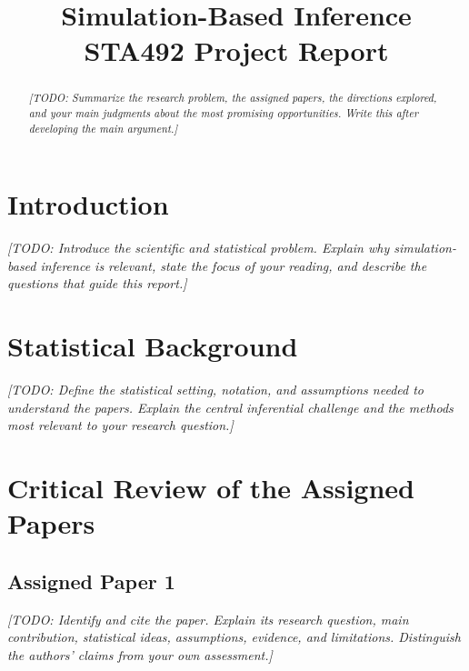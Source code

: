 \documentclass[11pt,letterpaper]{article}
\title{Simulation-Based Inference\\[0.3em]
  \large STA492 Project Report}
\author{\placeholder{Group member names}}
\date{\placeholder{Submission date}}
\newcommand{\placeholder}[1]{\textit{[TODO: #1]}}
\begin{document}
\maketitle

\begin{abstract}
\placeholder{Summarize the research problem, the assigned papers, the directions
explored, and your main judgments about the most promising opportunities. Write
this after developing the main argument.}
\end{abstract}

\section{Introduction}
\label{sec:introduction}

\placeholder{Introduce the scientific and statistical problem. Explain why
simulation-based inference is relevant, state the focus of your reading, and
describe the questions that guide this report.}

\section{Statistical Background}
\label{sec:background}

\placeholder{Define the statistical setting, notation, and assumptions needed to
understand the papers. Explain the central inferential challenge and the methods
most relevant to your research question.}


\section{Critical Review of the Assigned Papers}
\label{sec:papers}

\subsection{Assigned Paper 1}

\placeholder{Identify and cite the paper. Explain its research question, main
contribution, statistical ideas, assumptions, evidence, and limitations. Distinguish
the authors' claims from your own assessment.}
\end{document}
